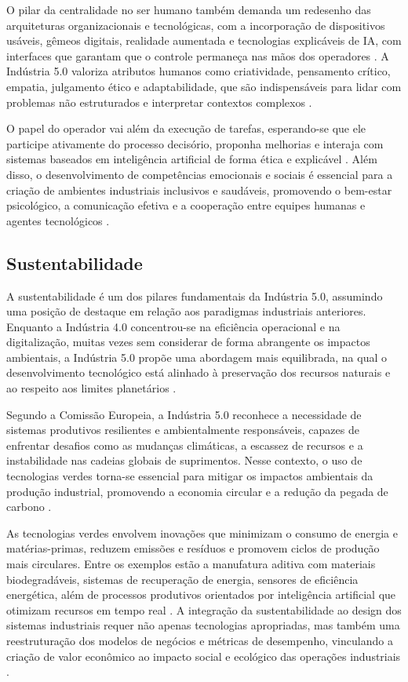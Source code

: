 O pilar da centralidade no ser humano também demanda um redesenho das arquiteturas organizacionais e tecnológicas, com a incorporação de dispositivos usáveis, gêmeos digitais, realidade aumentada e tecnologias explicáveis de IA, com interfaces que garantam que o controle permaneça nas mãos dos operadores \cite{TOTH2023, YANG2024}.
A Indústria 5.0 valoriza atributos humanos como criatividade, pensamento crítico, empatia, julgamento ético e adaptabilidade, que são indispensáveis para lidar com problemas não estruturados e interpretar contextos complexos \cite{RANNERTSHAUSER2022, Nahavandi2019}.

O papel do operador vai além da execução de tarefas, esperando-se que ele participe ativamente do processo decisório, proponha melhorias e interaja com sistemas baseados em inteligência artificial de forma ética e explicável \cite{TOTH2023, PIZON2023}.
Além disso, o desenvolvimento de competências emocionais e sociais é essencial para a criação de ambientes industriais inclusivos e saudáveis, promovendo o bem-estar psicológico, a comunicação efetiva e a cooperação entre equipes humanas e agentes tecnológicos \cite{Santana_2023}.

\subsection{Sustentabilidade}

A sustentabilidade é um dos pilares fundamentais da Indústria 5.0, assumindo uma posição de destaque em relação aos paradigmas industriais anteriores.
Enquanto a Indústria 4.0 concentrou-se na eficiência operacional e na digitalização, muitas vezes sem considerar de forma abrangente os impactos ambientais, a Indústria 5.0 propõe uma abordagem mais equilibrada, na qual o desenvolvimento tecnológico está alinhado à preservação dos recursos naturais e ao respeito aos limites planetários \cite{VALETTE2023, silva2024, Rame2024}.

Segundo a Comissão Europeia, a Indústria 5.0 reconhece a necessidade de sistemas produtivos resilientes e ambientalmente responsáveis, capazes de enfrentar desafios como as mudanças climáticas, a escassez de recursos e a instabilidade nas cadeias globais de suprimentos.
Nesse contexto, o uso de tecnologias verdes torna-se essencial para mitigar os impactos ambientais da produção industrial, promovendo a economia circular e a redução da pegada de carbono \cite{Rame2024}.

As tecnologias verdes envolvem inovações que minimizam o consumo de energia e matérias-primas, reduzem emissões e resíduos e promovem ciclos de produção mais circulares.
Entre os exemplos estão a manufatura aditiva com materiais biodegradáveis, sistemas de recuperação de energia, sensores de eficiência energética, além de processos produtivos orientados por inteligência artificial que otimizam recursos em tempo real \cite{TOTH2023, silva2024}.
A integração da sustentabilidade ao design dos sistemas industriais requer não apenas tecnologias apropriadas, mas também uma reestruturação dos modelos de negócios e métricas de desempenho, vinculando a criação de valor econômico ao impacto social e ecológico das operações industriais \cite{Santos2025}.

